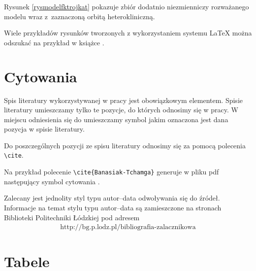 \documentclass[a4paper,12pt,twoside,polish]{book}
\theoremstyle{definition}
\theoremstyle{plain}
\theoremstyle{definition}
\newcommand{\bd}{\begin{eqnarray*}}
\newcommand{\ed}{\end{eqnarray*}}
\begin{document}
Rysunek \ref{rysmodelfktrojkat} pokazuje zbiór dodatnio niezmienniczy rozważanego modelu wraz z~zaznaczoną orbitą heterokliniczną.

Wiele przykładów rysunków tworzonych z wykorzystaniem systemu {\LaTeX} można odszukać na przykład w książce \cite{Goossens-Rahtz-Mittelbach}.

\section{Cytowania}

Spis literatury wykorzystywanej w pracy jest obowiązkowym elementem. Spisie literatury umieszczamy tylko te pozycje, do których odnosimy się w pracy. W miejscu odniesienia się do umieszczamy symbol jakim oznaczona jest dana pozycja w spisie literatury.

Do poszczególnych pozycji ze spisu literatury odnosimy się za pomocą polecenia \verb+\cite+. 

Na przykład polecenie \verb+\cite{Banasiak-Tchamga}+ generuje w pliku pdf następujący symbol cytowania \cite{Banasiak-Tchamga}.

Zalecany jest jednolity styl typu autor--data odwoływania się do źródeł. Informacje na temat stylu typu autor--data są zamieszczone na stronach Biblioteki Politechniki Łódzkiej pod adresem
\bd
\text{http://bg.p.lodz.pl/bibliografia-zalacznikowa}
\ed



\section{Tabele}
\end{document}
